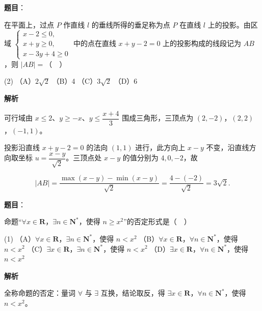 \begin{answer}

\textbf{题目}：

在平面上，过点 \(P\) 作直线 \(l\) 的垂线所得的垂足称为点 \(P\) 在直线 \(l\) 上的投影。由区域 \(\begin{cases} x-2\leqslant 0, \\ x+y\geqslant 0, \\ x-3y+4\geqslant 0 \end{cases}\) 中的点在直线 \(x+y-2=0\) 上的投影构成的线段记为 \(AB\)，则 \(|AB|=\)（　）

\begin{gkopts}(2)
\task （A）\(2\sqrt{2}\)
\task （B）4
\task （C）\(3\sqrt{2}\)
\task （D）6
\end{gkopts}

\textbf{解析}

可行域由 \(x\leqslant 2\)、\(y\geqslant -x\)、\(y\leqslant\dfrac{x+4}{3}\) 围成三角形，三顶点为 \((2,-2)\)，\((2,2)\)，\((-1,1)\)。

投影沿直线 \(x+y-2=0\) 的法向 \((1,1)\) 进行，此方向上 \(x-y\) 不变，沿直线方向取坐标 \(u=\dfrac{x-y}{\sqrt{2}}\)。三顶点处 \(x-y\) 的值分别为 \(4,0,-2\)，故

\nopagebreak[4]
\[
|AB|=\dfrac{\max(x-y)-\min(x-y)}{\sqrt{2}}=\dfrac{4-(-2)}{\sqrt{2}}=3\sqrt{2}.
\]


\end{answer}
\begin{answer}

\textbf{题目}：

命题“\(\forall x\in\mathbf{R}\)，\(\exists n\in\mathbf{N}^{*}\)，使得 \(n\geqslant x^{2}\)”的否定形式是（　）

\begin{gkopts}(1)
\task （A）\(\forall x\in\mathbf{R}\)，\(\exists n\in\mathbf{N}^{*}\)，使得 \(n<x^{2}\)
\task （B）\(\forall x\in\mathbf{R}\)，\(\forall n\in\mathbf{N}^{*}\)，使得 \(n<x^{2}\)
\task （C）\(\exists x\in\mathbf{R}\)，\(\exists n\in\mathbf{N}^{*}\)，使得 \(n<x^{2}\)
\task （D）\(\exists x\in\mathbf{R}\)，\(\forall n\in\mathbf{N}^{*}\)，使得 \(n<x^{2}\)
\end{gkopts}

\textbf{解析}

全称命题的否定：量词 \(\forall\) 与 \(\exists\) 互换，结论取反，得 \(\exists x\in\mathbf{R}\)，\(\forall n\in\mathbf{N}^{*}\)，使得 \(n<x^{2}\)。


\end{answer}
